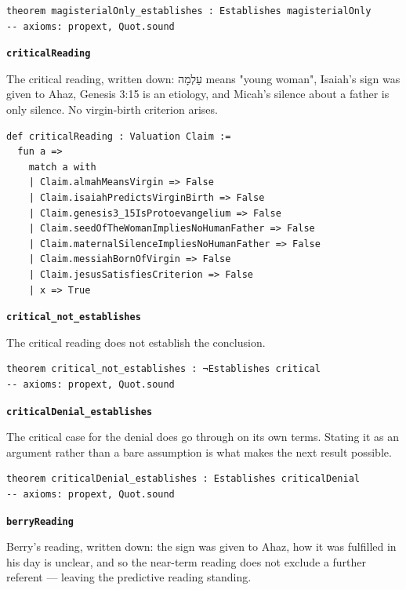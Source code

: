 \documentclass[11pt]{article}
\begin{document}
{\small\begin{verbatim}
theorem magisterialOnly_establishes : Establishes magisterialOnly
-- axioms: propext, Quot.sound
\end{verbatim}}
\par\medskip\noindent\textbf{\texttt{critical\allowbreak{}Reading}}\par\nobreak\noindent
The critical reading, written down: עַלְמָה means "young woman", Isaiah's sign was given to Ahaz, Genesis 3:15 is an etiology, and Micah's silence about a father is only silence. No virgin-birth criterion arises.

{\small\begin{verbatim}
def criticalReading : Valuation Claim :=
  fun a =>
    match a with
    | Claim.almahMeansVirgin => False
    | Claim.isaiahPredictsVirginBirth => False
    | Claim.genesis3_15IsProtoevangelium => False
    | Claim.seedOfTheWomanImpliesNoHumanFather => False
    | Claim.maternalSilenceImpliesNoHumanFather => False
    | Claim.messiahBornOfVirgin => False
    | Claim.jesusSatisfiesCriterion => False
    | x => True
\end{verbatim}}
\par\medskip\noindent\textbf{\texttt{critical\_\allowbreak{}not\_\allowbreak{}establishes}}\par\nobreak\noindent
The critical reading does not establish the conclusion.

{\small\begin{verbatim}
theorem critical_not_establishes : ¬Establishes critical
-- axioms: propext, Quot.sound
\end{verbatim}}
\par\medskip\noindent\textbf{\texttt{critical\allowbreak{}Denial\_\allowbreak{}establishes}}\par\nobreak\noindent
The critical case for the denial does go through on its own terms. Stating it as an argument rather than a bare assumption is what makes the next result possible.

{\small\begin{verbatim}
theorem criticalDenial_establishes : Establishes criticalDenial
-- axioms: propext, Quot.sound
\end{verbatim}}
\par\medskip\noindent\textbf{\texttt{berry\allowbreak{}Reading}}\par\nobreak\noindent
Berry's reading, written down: the sign was given to Ahaz, how it was fulfilled in his day is unclear, and so the near-term reading does not exclude a further referent — leaving the predictive reading standing.
\end{document}
